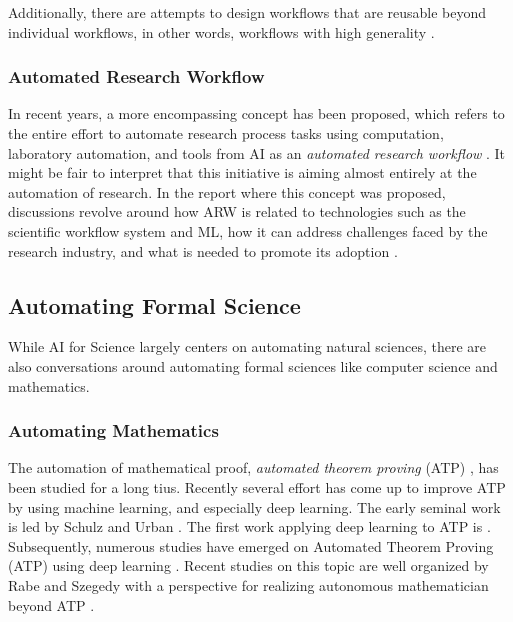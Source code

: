 \documentclass{article}
\begin{document}
Additionally, there are attempts to design workflows that are reusable beyond individual workflows, in other words, workflows with high generality \cite{hardisty2020canonical}.


\subsubsection{Automated Research Workflow}

In recent years, a more encompassing concept has been proposed, which refers to the entire effort to automate research process tasks using computation, laboratory automation, and tools from AI as an \textit{automated research workflow} \cite{national2022automated}. It might be fair to interpret that this initiative is aiming almost entirely at the automation of research. In the report where this concept was proposed, discussions revolve around how ARW is related to technologies such as the scientific workflow system and ML, how it can address challenges faced by the research industry, and what is needed to promote its adoption \cite{national2022automated}.


\subsection{Automating Formal Science}
While AI for Science largely centers on automating natural sciences, there are also conversations around automating formal sciences like computer science and mathematics.

\subsubsection{Automating Mathematics}
The automation of mathematical proof, \textit{automated theorem proving} (ATP) , has been studied for a long tius. Recently several effort has come up to improve ATP by using machine learning, and especially deep learning. The early seminal work is led by Schulz \cite{schulz2001learning} and Urban \cite{urban2004mptp,urban2008malarea}. The first work applying deep learning to ATP is \cite{irving2016deepmath}. Subsequently, numerous studies have emerged on Automated Theorem Proving (ATP) using deep learning \cite{bansal2019holist}. Recent studies on this topic are well organized by Rabe and Szegedy with a perspective for realizing autonomous mathematician beyond ATP \cite{rabe2021towards}.
\end{document}
